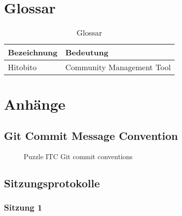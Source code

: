 \chapter{Glossar}

\begin{table}[H]
    \begin{tabular}{|L{0.3\textwidth}|L{0.6\textwidth}|}
        \hline
         \textbf{\color{white}Bezeichnung} & \textbf{\color{white}Bedeutung} \\[12pt]
        \hline
        Hitobito & Community Management Tool \\
        \hline
    \end{tabular}
    \caption{Glossar}
\end{table}

\chapter{Anhänge}

\section{Git Commit Message Convention}
\label{sec:gitconv}
\begin{figure}[h]
    \centering
    \caption{Puzzle ITC Git commit conventions}
\end{figure}

\section{Sitzungsprotokolle}
\subsection{Sitzung 1}

